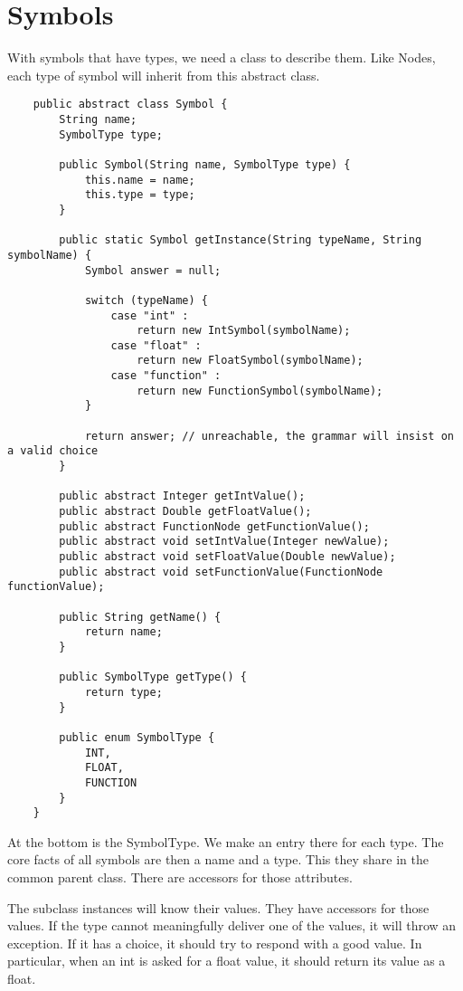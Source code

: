 \section{Symbols}

With symbols that have types, we need a class to describe them. Like Nodes,
each type of symbol will inherit from this abstract class.

{\footnotesize
\begin{verbatim}
    public abstract class Symbol {
        String name;
        SymbolType type;
    
        public Symbol(String name, SymbolType type) {
            this.name = name;
            this.type = type;
        }
    
        public static Symbol getInstance(String typeName, String symbolName) {
            Symbol answer = null;
    
            switch (typeName) {
                case "int" :
                    return new IntSymbol(symbolName);
                case "float" :
                    return new FloatSymbol(symbolName);
                case "function" :
                    return new FunctionSymbol(symbolName);
            }
    
            return answer; // unreachable, the grammar will insist on a valid choice
        }
    
        public abstract Integer getIntValue();
        public abstract Double getFloatValue();
        public abstract FunctionNode getFunctionValue();
        public abstract void setIntValue(Integer newValue);
        public abstract void setFloatValue(Double newValue);
        public abstract void setFunctionValue(FunctionNode functionValue);
    
        public String getName() {
            return name;
        }
    
        public SymbolType getType() {
            return type;
        }
    
        public enum SymbolType {
            INT,
            FLOAT,
            FUNCTION
        }
    }
\end{verbatim}
}

At the bottom is the SymbolType. We make an entry there for
each type. The core facts of all symbols are then a name and a type.
This they share in the common parent class.
There are accessors for those attributes.

The subclass instances will know their values. They have accessors for
those values. If the type cannot meaningfully deliver one of the values,
it will throw an exception. If it has a choice, it should try to respond
with a good value. In particular, when an int is asked for a float
value, it should return its value as a float.

